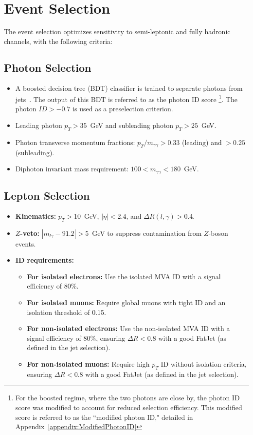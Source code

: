 \section{Event Selection}
The event selection optimizes sensitivity to semi-leptonic and fully hadronic channels, with the following criteria:

\subsection*{Photon Selection}
\begin{itemize}
    \item A boosted decision tree (BDT) classifier is trained to separate photons from jets~\cite{Sirunyan:2018ouh}.
            The output of this BDT is referred to as the photon ID score
            \footnote{For the boosted regime, where the two photons are close by, the photon ID score was modified to
            account for reduced selection efficiency.
            This modified score is referred to as the ``modified photon ID," detailed in
            Appendix~\ref{appendix:ModifiedPhotonID}}. The photon $ID > -0.7$ is used as a preselection criterion.
    \item Leading photon \(p_T > 35\)~GeV and subleading photon \(p_T > 25\)~GeV.
    \item Photon transverse momentum fractions: \(p_T/m_{\gamma\gamma} > 0.33\) (leading) and \(> 0.25\) (subleading).
    \item Diphoton invariant mass requirement: \(100 < m_{\gamma\gamma} < 180\)~GeV.
\end{itemize}


\subsection*{Lepton Selection}
\begin{itemize}
    \item \textbf{Kinematics:} \(p_T > 10\)~GeV, \(|\eta| < 2.4\), and \(\Delta R(l, \gamma) > 0.4\).
    \item \textbf{\(Z\)-veto:} \(|m_{l\gamma} - 91.2| > 5\)~GeV to suppress contamination from \(Z\)-boson events.
    \item \textbf{ID requirements:}
        \begin{itemize}
            \item \textbf{For isolated electrons:} Use the isolated MVA ID with a signal efficiency of 80\%.
            \item \textbf{For isolated muons:} Require global muons with tight ID and an isolation threshold of 0.15.
            \item \textbf{For non-isolated electrons:} Use the non-isolated MVA ID with a signal efficiency of 80\%, ensuring \(\Delta R < 0.8\) with a good FatJet (as defined in the jet selection).
            \item \textbf{For non-isolated muons:} Require high \(p_T\) ID without isolation criteria, ensuring \(\Delta R < 0.8\) with a good FatJet (as defined in the jet selection).
        \end{itemize}
\end{itemize}

